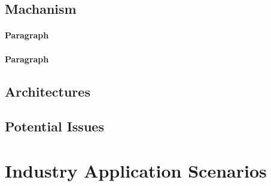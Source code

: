 \documentclass[fleqn,10pt]{SelfArx} %
\begin{document}




\subsection{Machanism}


\paragraph{Paragraph} \lipsum[7] %
\paragraph{Paragraph} \lipsum[8] %

\subsection{Architectures}




\subsection{Potential Issues}

\section{Industry Application Scenarios}
\end{document}
